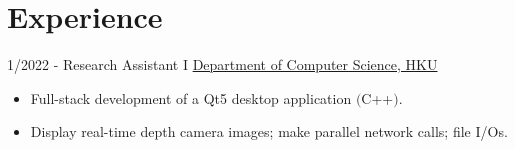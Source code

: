 \documentclass[letterpaper]{twentysecondcv} %
\begin{document}
\makeprofile %



\section{Experience}{\faAlignJustify}

\begin{twenty} %


\twentyitem
    	{1/2022 - }
	{}
         {Research Assistant I}
         {\href{https://www.cs.hku.hk/}{Department of Computer Science, HKU}}
        {}
        {\vspace{-2mm}\begin{itemize}[topsep=0pt,partopsep=0pt]
				\item Full-stack development of a Qt5 desktop application \textcolor{pblue}{$($C++$)$}.
				\item Display \textcolor{pblue}{real-time} depth camera images; make \textcolor{pblue}{parallel network calls}; file I/Os.
				\end{itemize} }\\


\end{twenty}
\end{document}
